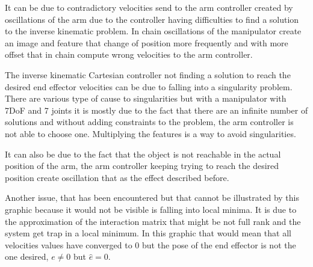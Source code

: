 It can be due to contradictory velocities send to the arm controller created by oscillations of the arm due to the controller having difficulties to find a solution to the inverse kinematic problem. In chain oscillations of the manipulator create an image and feature that change of position more frequently and with more offset that in chain compute wrong velocities to the arm controller. 

The inverse kinematic Cartesian controller not finding a solution to reach the desired end effector velocities can be due to falling into a singularity problem. There are various type of cause to singularities but with a manipulator with 7DoF and 7 joints it is mostly due to the fact that there are an infinite number of solutions and without adding constraints to the problem, the arm controller is not able to choose one. Multiplying the features is a way to avoid singularities.

It can also be due to the fact that the object is not reachable in the actual position of the arm, the arm controller keeping trying to reach the desired position create oscillation that as the effect described before.

Another issue, that has been encountered but that cannot be illustrated by this graphic because it would not be visible is falling into local minima. It is due to the approximation of the interaction matrix that might be not full rank and the system get trap in a local minimum. In this graphic that would mean that all velocities values have converged to 0 but the pose of the end effector is not the one desired, $e \neq 0$ but $ \hat e = 0$. \\

